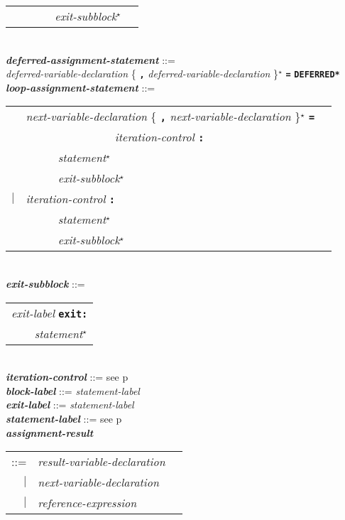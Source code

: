 \documentclass[12pt]{article}
\newcommand{\TT}[1]{{\tt \bfseries #1}}
\newcommand{\STAR}{{\Large $^\star$}}
\newcommand{\ttkey}[1]{{\tt \bfseries #1}}
\newcommand{\emkey}[1]{{\em \bfseries #1}}
\newcommand{\pagref}[1]{p\pageref{#1}}
\newenvironment{indpar}[1][0.3in]%
	{\begin{list}{}%
		     {\setlength{\itemsep}{0in}%
		      \setlength{\topsep}{0in}%
		      \setlength{\parsep}{1ex}%
		      \setlength{\labelwidth}{#1}%
		      \setlength{\leftmargin}{#1}%
		      \addtolength{\leftmargin}{\labelsep}}%
	 \item}%
	{\end{list}}
\begin{document}
\begin{indpar}
\begin{tabular}[t]{@{}rll}
        & ~~~~~ {\em exit-subblock}\STAR{} \\
    \end{tabular}
\\[0.5ex]
\emkey{deferred-assignment-statement} ::= \\
\hspace*{0.5in}
        {\em deferred-variable-declaration}
	    \{ \TT{,} {\em deferred-variable-declaration} \}\STAR{}
	    \TT{=} \ttkey{*DEFERRED*}
\\[0.5ex]
\emkey{loop-assignment-statement} ::= \\
\hspace*{0.5in}
    \begin{tabular}[t]{@{}rll}
        & {\em next-variable-declaration}
                \{ \TT{,} {\em next-variable-declaration} \}\STAR{}
		\TT{=} \\
	& ~~~~~~~~~~~~~~~ {\em iteration-control} \TT{:} \\
        & ~~~~~ {\em statement}\STAR{} \\
        & ~~~~~ {\em exit-subblock}\STAR{} \\
    $|$ & {\em iteration-control} \TT{:} \\
        & ~~~~~ {\em statement}\STAR{} \\
        & ~~~~~ {\em exit-subblock}\STAR{} \\
    \end{tabular}
\\[0.5ex]
\emkey{exit-subblock} ::=
    \begin{tabular}[t]{l}
    {\em exit-label} \ttkey{exit}\TT{:} \\
    \TT{~~~~}{\em statement}\STAR{} \\
    \end{tabular}
\\[0.5ex]
\emkey{iteration-control} ::= see \pagref{ITERATION-CONTROL}
\\[0.5ex]
\emkey{block-label}\label{BLOCK-LABEL} ::= {\em statement-label}
\\[0.5ex]
\emkey{exit-label} ::= {\em statement-label}
\\[0.5ex]
\emkey{statement-label} ::= see \pagref{STATEMENT-LABEL}
\\[0.5ex]
\emkey{assignment-result}\label{ASSIGNMENT-RESULT}
    \begin{tabular}[t]{@{}rll}
    ::= & {\em result-variable-declaration} \\
    $|$ & {\em next-variable-declaration} \\
    $|$ & {\em reference-expression}

\end{tabular}
\end{indpar}
\end{document}
